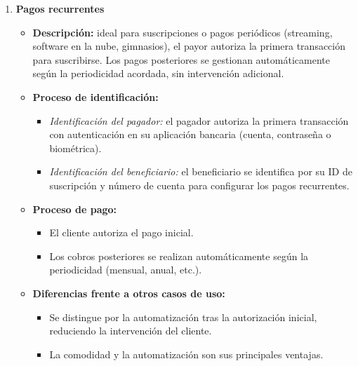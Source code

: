 \begin{enumerate}
    \item \textbf{Pagos recurrentes}
    \begin{itemize}
        \item \textbf{Descripción:} ideal para suscripciones o pagos periódicos (streaming, software en la nube, gimnasios), el payor autoriza la primera transacción para suscribirse. Los pagos posteriores se gestionan automáticamente según la periodicidad acordada, sin intervención adicional.
        \item \textbf{Proceso de identificación:}
        \begin{itemize}
            \item \textit{Identificación del pagador:} el pagador autoriza la primera transacción con autenticación en su aplicación bancaria (cuenta, contraseña o biométrica).
            \item \textit{Identificación del beneficiario:} el beneficiario se identifica por su ID de suscripción y número de cuenta para configurar los pagos recurrentes.
        \end{itemize}
        \item \textbf{Proceso de pago:}
        \begin{itemize}
            \item El cliente autoriza el pago inicial.
            \item Los cobros posteriores se realizan automáticamente según la periodicidad (mensual, anual, etc.).
        \end{itemize}
        \item \textbf{Diferencias frente a otros casos de uso:}
        \begin{itemize}
            \item Se distingue por la automatización tras la autorización inicial, reduciendo la intervención del cliente.
            \item La comodidad y la automatización son sus principales ventajas.
        \end{itemize}
    \end{itemize}


\end{enumerate}
